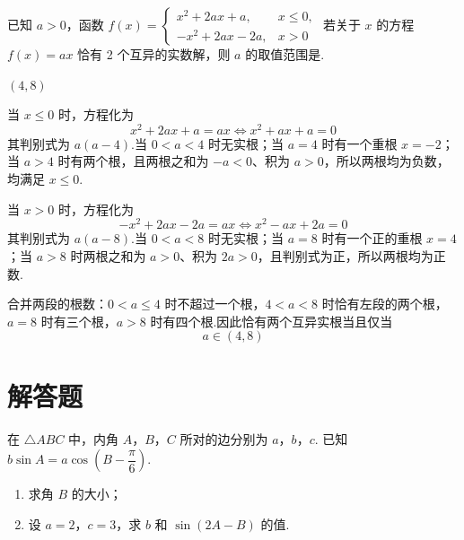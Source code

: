 \begin{problem}
已知 \(a>0\)，函数
\(f(x)=\begin{cases}
x^2+2ax+a, & x\le0,\\
-x^2+2ax-2a, & x>0
\end{cases}\)
若关于 \(x\) 的方程 \(f(x)=ax\) 恰有 2 个互异的实数解，则 \(a\) 的取值范围是\fillinblank{}.
\end{problem}

\begin{answer}
\((4,8)\)
\end{answer}

\begin{solution}
当 \(x\le0\) 时，方程化为
\[
x^2+2ax+a=ax\Longleftrightarrow x^2+ax+a=0
\]
其判别式为 \(a(a-4)\).当 \(0<a<4\) 时无实根；当 \(a=4\) 时有一个重根 \(x=-2\)；当 \(a>4\) 时有两个根，且两根之和为 \(-a<0\)、积为 \(a>0\)，所以两根均为负数，均满足 \(x\le0\).

当 \(x>0\) 时，方程化为
\[
-x^2+2ax-2a=ax\Longleftrightarrow x^2-ax+2a=0
\]
其判别式为 \(a(a-8)\).当 \(0<a<8\) 时无实根；当 \(a=8\) 时有一个正的重根 \(x=4\)；当 \(a>8\) 时两根之和为 \(a>0\)、积为 \(2a>0\)，且判别式为正，所以两根均为正数.

合并两段的根数：\(0<a\le4\) 时不超过一个根，\(4<a<8\) 时恰有左段的两个根，\(a=8\) 时有三个根，\(a>8\) 时有四个根.因此恰有两个互异实根当且仅当
\[
a\in(4,8)
\]
\end{solution}

\section{解答题}

\begin{problem}

在 \(\triangle ABC\) 中，内角 \(A\)，\(B\)，\(C\) 所对的边分别为 \(a\)，\(b\)，\(c\). 已知 \(b\sin A=a\cos\left(B-\dfrac{\pi}{6}\right)\).

\begin{enumerate}
\item 求角 \(B\) 的大小；
\item 设 \(a=2\)，\(c=3\)，求 \(b\) 和 \(\sin(2A-B)\) 的值.
\end{enumerate}
\end{problem}

